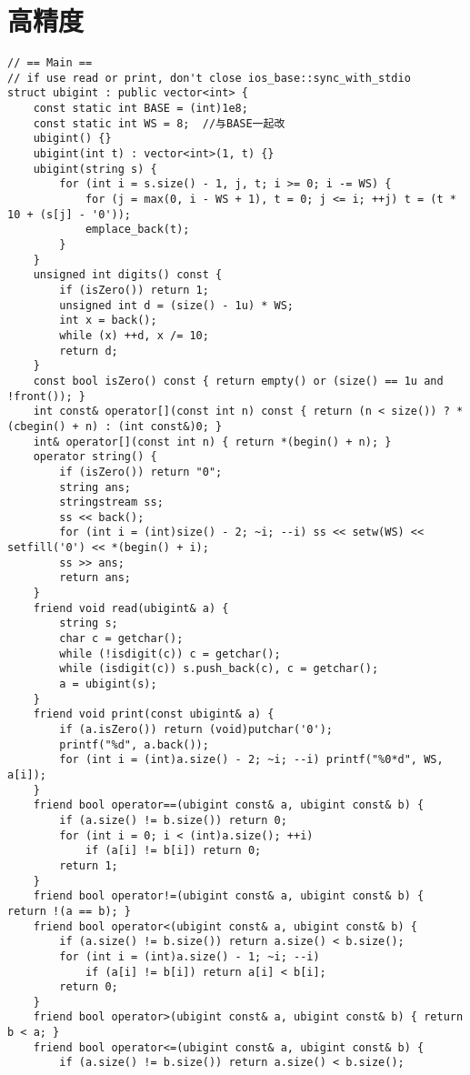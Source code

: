 \section{高精度}

\begin{verbatim}
// == Main ==
// if use read or print, don't close ios_base::sync_with_stdio
struct ubigint : public vector<int> {
    const static int BASE = (int)1e8;
    const static int WS = 8;  //与BASE一起改
    ubigint() {}
    ubigint(int t) : vector<int>(1, t) {}
    ubigint(string s) {
        for (int i = s.size() - 1, j, t; i >= 0; i -= WS) {
            for (j = max(0, i - WS + 1), t = 0; j <= i; ++j) t = (t * 10 + (s[j] - '0'));
            emplace_back(t);
        }
    }
    unsigned int digits() const {
        if (isZero()) return 1;
        unsigned int d = (size() - 1u) * WS;
        int x = back();
        while (x) ++d, x /= 10;
        return d;
    }
    const bool isZero() const { return empty() or (size() == 1u and !front()); }
    int const& operator[](const int n) const { return (n < size()) ? *(cbegin() + n) : (int const&)0; }
    int& operator[](const int n) { return *(begin() + n); }
    operator string() {
        if (isZero()) return "0";
        string ans;
        stringstream ss;
        ss << back();
        for (int i = (int)size() - 2; ~i; --i) ss << setw(WS) << setfill('0') << *(begin() + i);
        ss >> ans;
        return ans;
    }
    friend void read(ubigint& a) {
        string s;
        char c = getchar();
        while (!isdigit(c)) c = getchar();
        while (isdigit(c)) s.push_back(c), c = getchar();
        a = ubigint(s);
    }
    friend void print(const ubigint& a) {
        if (a.isZero()) return (void)putchar('0');
        printf("%d", a.back());
        for (int i = (int)a.size() - 2; ~i; --i) printf("%0*d", WS, a[i]);
    }
    friend bool operator==(ubigint const& a, ubigint const& b) {
        if (a.size() != b.size()) return 0;
        for (int i = 0; i < (int)a.size(); ++i)
            if (a[i] != b[i]) return 0;
        return 1;
    }
    friend bool operator!=(ubigint const& a, ubigint const& b) { return !(a == b); }
    friend bool operator<(ubigint const& a, ubigint const& b) {
        if (a.size() != b.size()) return a.size() < b.size();
        for (int i = (int)a.size() - 1; ~i; --i)
            if (a[i] != b[i]) return a[i] < b[i];
        return 0;
    }
    friend bool operator>(ubigint const& a, ubigint const& b) { return b < a; }
    friend bool operator<=(ubigint const& a, ubigint const& b) {
        if (a.size() != b.size()) return a.size() < b.size();

\end{verbatim}
